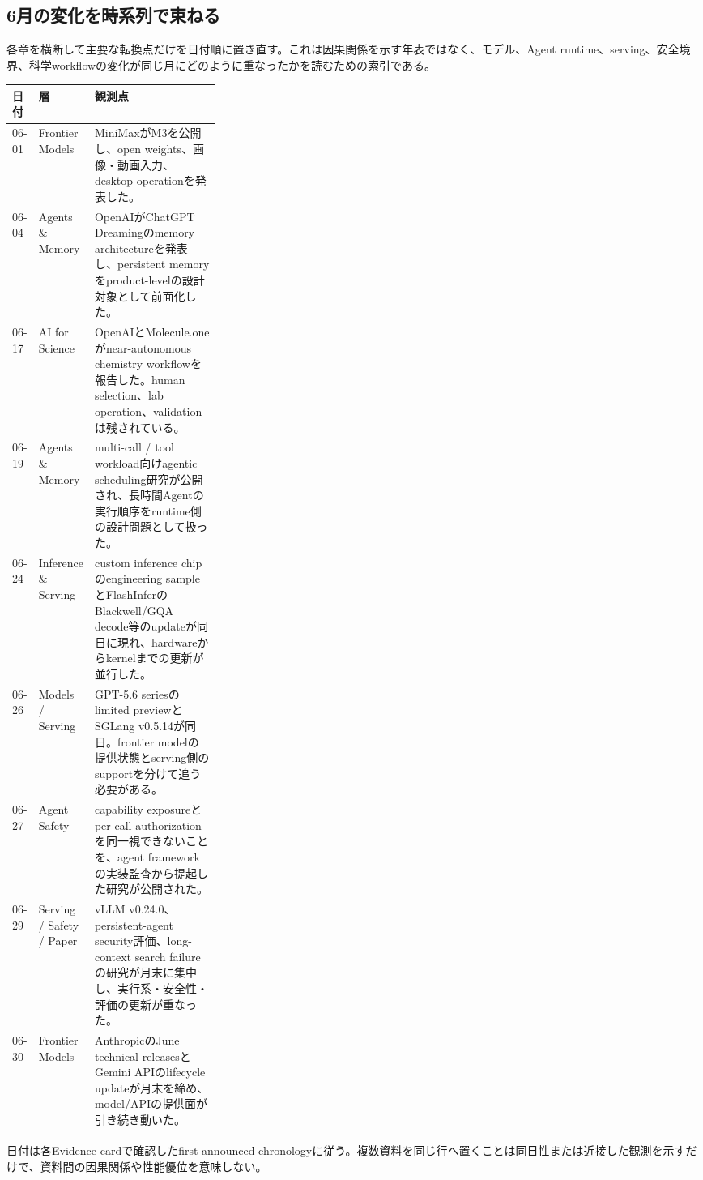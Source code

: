 \subsection*{6月の変化を時系列で束ねる}
\noindent 各章を横断して主要な転換点だけを日付順に置き直す。これは因果関係を示す年表ではなく、モデル、Agent runtime、serving、安全境界、科学workflowの変化が同じ月にどのように重なったかを読むための索引である。
\medskip
\begin{center}
\scriptsize
\renewcommand{\arraystretch}{1.08}
\begin{tabularx}{\linewidth}{@{}p{0.10\linewidth}p{0.20\linewidth}X@{}}
\toprule
日付 & 層 & 観測点 \\
\midrule
06-01 & Frontier Models & MiniMaxがM3を公開し、open weights、画像・動画入力、desktop operationを発表した。 \cite{src-d8e13386974c} \\
06-04 & Agents \& Memory & OpenAIがChatGPT Dreamingのmemory architectureを発表し、persistent memoryをproduct-levelの設計対象として前面化した。 \cite{src-c3ab33c62226} \\
06-17 & AI for Science & OpenAIとMolecule.oneがnear-autonomous chemistry workflowを報告した。human selection、lab operation、validationは残されている。 \cite{src-5ff2f715f1e6} \\
06-19 & Agents \& Memory & multi-call / tool workload向けagentic scheduling研究が公開され、長時間Agentの実行順序をruntime側の設計問題として扱った。 \cite{src-e8d9fd84bddc} \\
06-24 & Inference \& Serving & custom inference chipのengineering sampleとFlashInferのBlackwell/GQA decode等のupdateが同日に現れ、hardwareからkernelまでの更新が並行した。 \cite{src-855db08b75f6,src-272a6dac5bcc} \\
06-26 & Models / Serving & GPT-5.6 seriesのlimited previewとSGLang v0.5.14が同日。frontier modelの提供状態とserving側のsupportを分けて追う必要がある。 \cite{src-30f48121decc,src-538cecdad845} \\
06-27 & Agent Safety & capability exposureとper-call authorizationを同一視できないことを、agent frameworkの実装監査から提起した研究が公開された。 \cite{src-02da0db00c2d} \\
06-29 & Serving / Safety / Paper & vLLM v0.24.0、persistent-agent security評価、long-context search failureの研究が月末に集中し、実行系・安全性・評価の更新が重なった。 \cite{src-6cc910fb0183,src-6da0c5a88fa4,src-8603fd60d637} \\
06-30 & Frontier Models & AnthropicのJune technical releasesとGemini APIのlifecycle updateが月末を締め、model/APIの提供面が引き続き動いた。 \cite{src-f6aa679babd7,src-a24fd97eb3d0} \\
\bottomrule
\end{tabularx}
\renewcommand{\arraystretch}{1.0}
\end{center}
\normalsize
\begin{claimboundary}[この年表の境界]
日付は各Evidence cardで確認したfirst-announced chronologyに従う。複数資料を同じ行へ置くことは同日性または近接した観測を示すだけで、資料間の因果関係や性能優位を意味しない。
\end{claimboundary}

